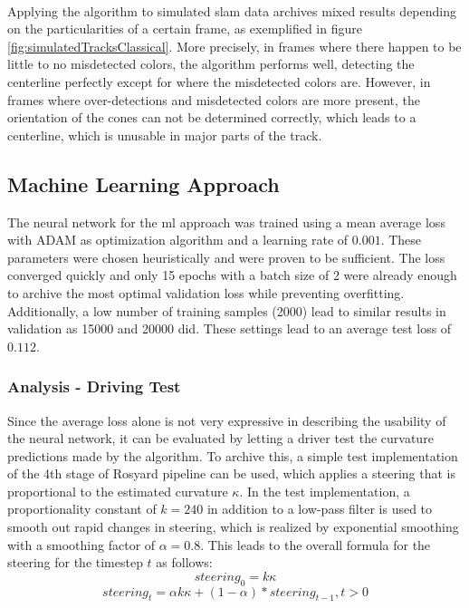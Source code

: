 \\Applying the algorithm to simulated \ac{slam} data archives mixed results depending on the particularities of a certain frame, as exemplified in figure \ref{fig:simulatedTracksClassical}. More precisely, in frames where there happen to be little to no misdetected colors, the algorithm performs well, detecting the centerline perfectly except for where the misdetected colors are. However, in frames where over-detections and misdetected colors are more present, the orientation of the cones can not be determined correctly, which leads to a centerline, which is unusable in major parts of the track. 


\subsection{Machine Learning Approach}
The neural network for the \ac{ml} approach was trained using a mean average loss with ADAM as optimization algorithm and a learning rate of $0.001$. These parameters were chosen heuristically and were proven to be sufficient. The loss converged quickly and only 15 epochs with a batch size of 2 were already enough to archive the most optimal validation loss while preventing overfitting. Additionally, a low number of training samples (2000) lead to similar results in validation as 15000 and 20000 did. These settings lead to an average test loss of $0.112$.

\subsubsection{Analysis - Driving Test}
Since the average loss alone is not very expressive in describing the usability of the neural network, it can be evaluated by letting a driver test the curvature predictions made by the algorithm. To archive this, a simple test implementation of the 4th stage of Rosyard pipeline can be used, which applies a steering that is proportional to the estimated curvature $\kappa$. In the test implementation, a proportionality constant of $k = 240$ in addition to a low-pass filter is used to smooth out rapid changes in steering, which is realized by exponential smoothing with a smoothing factor of $\alpha = 0.8$. This leads to the overall formula for the steering for the timestep $t$ as follows:\\
$$steering_0= k\kappa$$
$$steering_t= \alpha k\kappa + (1-\alpha)*steering_{t-1}, t > 0$$ 

